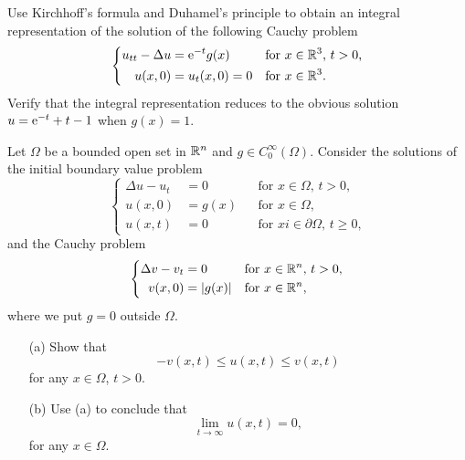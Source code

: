 \begin{problem}
  Use Kirchhoff's formula and Duhamel's principle to obtain an integral
  representation of the solution of the following Cauchy problem
  \[
    \left\{
      \begin{aligned}
        u_{tt}-\Delta u&=\mathrm{e}^{-t} g(x)&&\text{for \(x\in\mathbb{R}^3\), \(t>0\),}\\
        u(x,0)&=u_t(x,0)=0&&\text{for \(x\in\mathbb{R}^3\).}
      \end{aligned}
    \right.
  \]
  Verify that the integral representation reduces to the obvious solution
  \(u=\mathrm{e}^{-t}+t-1\) when \(g(x)=1\).
\end{problem}
\begin{solution*}
\end{solution*}

\begin{problem}
  Let \(\Omega\) be a bounded open set in \(\mathbb{R}^n\) and \(g\in
  C_0^\infty(\Omega)\). Consider the solutions of the initial boundary
  value problem
  \[
    \left\{
      \begin{aligned}
        \Delta u-u_t&=0&&\text{for \(x\in\Omega\), \(t>0\),}\\
        u(x,0)&=g(x)&&\text{for \(x\in\Omega\),}\\
        u(x,t)&=0&&\text{for \(xi\in\partial\Omega\), \(t\geq 0\),}
      \end{aligned}
    \right.
  \]
  and the Cauchy problem
  \[
    \left\{
      \begin{aligned}
        \Delta v-v_t&=0&&\text{for \(x\in\mathbb{R}^n\), \(t>0\),}\\
        v(x,0)&=|g(x)|&&\text{for \(x\in\mathbb{R}^n\),}
      \end{aligned}
    \right.
  \]
  where we put \(g=0\) outside \(\Omega\).
  \begin{itemize}[noitemsep]
  \item[(a)] Show that
    \[
      -v(x,t)\leq u(x,t)\leq v(x,t)
    \]
    for any \(x\in\Omega\), \(t>0\).
  \item[(b)] Use (a) to conclude that
    \[
      \lim_{t\to\infty} u(x,t)=0,
    \]
    for any \(x\in\Omega\).
  \end{itemize}
\end{problem}
\begin{solution*}
\end{solution*}

